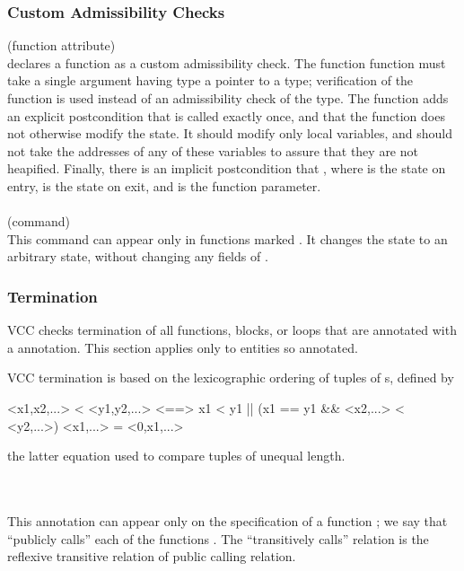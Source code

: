 \documentclass[preprint,nocopyrightspace]{sigplanconf}
\begin{document}
{{{\subsubsection{Custom Admissibility Checks}
 (function attribute)\\
 declares a function as a custom admissibility check. The function
function must take a single argument having type a pointer to a  type;
verification of the function is used instead of an admissibility check
of the  type. The function adds an explicit postcondition
that   is called exactly once, and that the
function does not otherwise modify the state. It should modify only
local variables, and should not take the addresses of any of these
variables to assure that they are not heapified. Finally, there is an
implicit postcondition that , where  is
the state on entry,  is the state on exit, and  is the
function parameter.
\\\\
 (command)\\
This command can appear only in functions
marked . It changes the state to an arbitrary
\vcc{\legal} state, without changing any fields of .

\subsubsection{Termination}
VCC checks termination of all functions, blocks, or loops that are
annotated with a  annotation. This section applies
only to entities so annotated.

VCC termination is based on the lexicographic ordering of tuples
of \vcc{\natural}s, defined by
\begin{VCC}
<x1,x2,...> < <y1,y2,...> <==> x1 < y1 || (x1 == y1 && <x2,...> < <y2,...>)
<x1,...> = <0,x1,...>
\end{VCC}
the latter equation used to compare tuples of unequal length.

\\
\\ 
This annotation can appear only on the specification of a
function ; we say that  ``publicly
calls'' each of the functions . 
The ``transitively calls'' relation is the reflexive transitive
relation of public calling relation.

}}}
\end{document}

